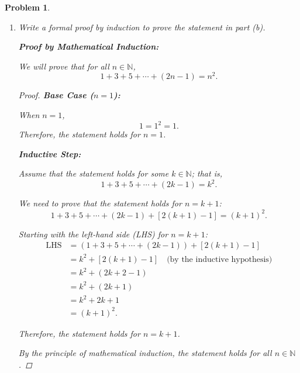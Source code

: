 \documentclass[12pt]{article}
\newtheorem{problem}{Problem}
\theoremstyle{definition}
\begin{document}
\begin{problem}
\begin{enumerate}[label=(\alph*)]
    \textbf{Inductive Hypothesis:} Assume that for some \( k \in \mathbb{N} \),
    \[
    1 + 3 + 5 + \cdots + (2k - 1) = k^2.
    \]
    
    \textbf{What we must prove:} We need to show that
    \[
    1 + 3 + 5 + \cdots + (2k - 1) + [2(k+1) - 1] = (k+1)^2.
    \]
    That is, adding the next odd number \( 2(k+1) - 1 \) to the sum up to \( k \) yields \( (k+1)^2 \).
    
    \item Write a formal proof by induction to prove the statement in part (b).
    
    \textbf{Proof by Mathematical Induction:}

    We will prove that for all \( n \in \mathbb{N} \),
    \[
    1 + 3 + 5 + \cdots + (2n - 1) = n^2.
    \]

    \begin{proof}
    \textbf{Base Case (\( n = 1 \)):}
    
    When \( n = 1 \),
    \[
    1 = 1^2 = 1.
    \]
    Therefore, the statement holds for \( n = 1 \).
    
    \textbf{Inductive Step:}
    
    Assume that the statement holds for some \( k \in \mathbb{N} \); that is,
    \[
    1 + 3 + 5 + \cdots + (2k - 1) = k^2.
    \]
    
    We need to prove that the statement holds for \( n = k + 1 \):
    \[
    1 + 3 + 5 + \cdots + (2k - 1) + [2(k+1) - 1] = (k+1)^2.
    \]
    
    Starting with the left-hand side (LHS) for \( n = k + 1 \):
    \[
    \begin{aligned}
    \text{LHS} &= \left( 1 + 3 + 5 + \cdots + (2k - 1) \right) + \left[ 2(k+1) - 1 \right] \\
    &= k^2 + [2(k+1) - 1] \quad \text{(by the inductive hypothesis)} \\
    &= k^2 + (2k + 2 - 1) \\
    &= k^2 + (2k + 1) \\
    &= k^2 + 2k + 1 \\
    &= (k + 1)^2.
    \end{aligned}
    \]
    
    Therefore, the statement holds for \( n = k + 1 \).
    
    By the principle of mathematical induction, the statement holds for all \( n \in \mathbb{N} \).
    \end{proof}
    
\end{enumerate}
\end{problem}
\end{document}

